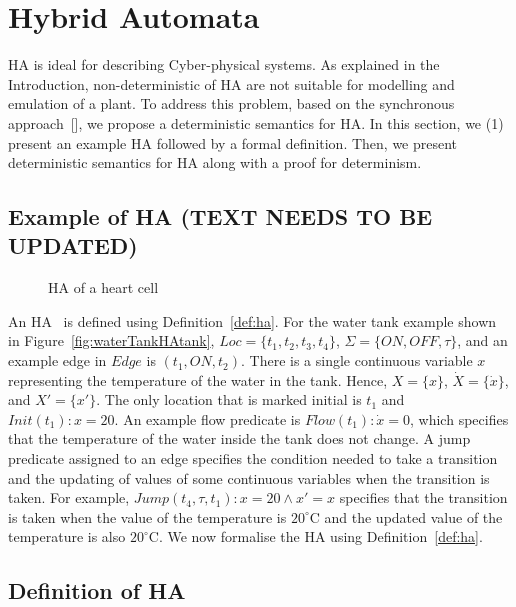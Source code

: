 \section{Hybrid Automata}
\label{sec:HA}



\acf{HA} is ideal for describing 
Cyber-physical systems. As explained in the Introduction,
non-deterministic of \ac{HA} are not suitable for modelling and
emulation of a plant. To address this problem, based on the
synchronous approach~[], we propose a deterministic semantics for \ac{HA}.
In this section, we (1) present an example \ac{HA} 
followed by a formal definition.
Then, we present deterministic semantics for \ac{HA} 
along with a proof for determinism.



\subsection{Example of \ac{HA} (TEXT NEEDS TO BE UPDATED)}

\begin{figure}
\centering

\caption{\acf{HA} of a heart cell}
\end{figure}

An HA~\cite{lynch03} is defined using Definition~\ref{def:ha}. For the
water tank example shown in Figure~\ref{fig:waterTankHAtank},
$Loc=\{t_1, t_2, t_3, t_4\}$, $\Sigma=\{ON, OFF, \tau\}$, and an example
edge in $Edge$ is $(t_1, ON, t_2)$. There is a single continuous
variable $x$ representing the temperature of the water in the
tank. Hence, $X=\{x\}$, $\dot{X}=\{\dot{x}\}$, and $X'=\{x'\}$. The only
location that is marked initial is $t_1$ and $Init(t_1): x=20$. An
example flow predicate is $Flow(t_1): \dot{x}=0$, which specifies that
the temperature of the water inside the tank does not change.  A jump
predicate assigned to an edge specifies the condition needed to take a
transition and the updating of values of some continuous variables when
the transition is taken.  For example,
$Jump(t_4, \tau, t_1): x=20 \wedge x'=x$ specifies that the transition
is taken when the value of the temperature is $20^\circ$C and the
updated value of the temperature is also $20^\circ$C. We now formalise
the HA using Definition~\ref{def:ha}.

\subsection{Definition of \ac{HA}}

